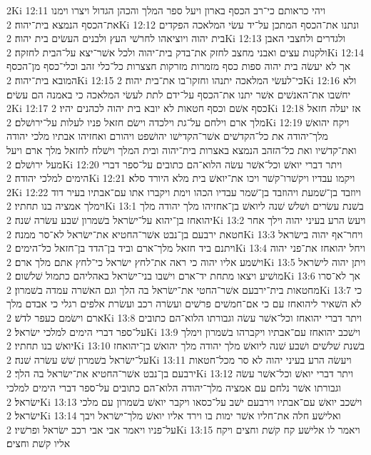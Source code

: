 2Ki 12:11  ויהי כראותם כי־רב הכסף בארון ויעל ספר המלך והכהן הגדול ויצרו וימנו את־הכסף הנמצא בית־יהוה׃
2Ki 12:12  ונתנו את־הכסף המתכן על־יד עשׂי המלאכה הפקדים בית יהוה ויוציאהו לחרשׁי העץ ולבנים העשׂים בית יהוה׃
2Ki 12:13  ולגדרים ולחצבי האבן ולקנות עצים ואבני מחצב לחזק את־בדק בית־יהוה ולכל אשׁר־יצא על־הבית לחזקה׃
2Ki 12:14  אך לא יעשׂה בית יהוה ספות כסף מזמרות מזרקות חצצרות כל־כלי זהב וכלי־כסף מן־הכסף המובא בית־יהוה׃
2Ki 12:15  כי־לעשׂי המלאכה יתנהו וחזקו־בו את־בית יהוה׃
2Ki 12:16  ולא יחשׁבו את־האנשׁים אשׁר יתנו את־הכסף על־ידם לתת לעשׂי המלאכה כי באמנה הם עשׂים׃
2Ki 12:17  כסף אשׁם וכסף חטאות לא יובא בית יהוה לכהנים יהיו׃
2Ki 12:18  אז יעלה חזאל מלך ארם וילחם על־גת וילכדה וישׂם חזאל פניו לעלות על־ירושׁלם׃
2Ki 12:19  ויקח יהואשׁ מלך־יהודה את כל־הקדשׁים אשׁר־הקדישׁו יהושׁפט ויהורם ואחזיהו אבתיו מלכי יהודה ואת־קדשׁיו ואת כל־הזהב הנמצא באצרות בית־יהוה ובית המלך וישׁלח לחזאל מלך ארם ויעל מעל ירושׁלם׃
2Ki 12:20  ויתר דברי יואשׁ וכל־אשׁר עשׂה הלוא־הם כתובים על־ספר דברי הימים למלכי יהודה׃
2Ki 12:21  ויקמו עבדיו ויקשׁרו־קשׁר ויכו את־יואשׁ בית מלא היורד סלא׃
2Ki 12:22  ויוזבד בן־שׁמעת ויהוזבד בן־שׁמר עבדיו הכהו וימת ויקברו אתו עם־אבתיו בעיר דוד וימלך אמציה בנו תחתיו׃
2Ki 13:1  בשׁנת עשׂרים ושׁלשׁ שׁנה ליואשׁ בן־אחזיהו מלך יהודה מלך יהואחז בן־יהוא על־ישׂראל בשׁמרון שׁבע עשׂרה שׁנה׃
2Ki 13:2  ויעשׂ הרע בעיני יהוה וילך אחר חטאת ירבעם בן־נבט אשׁר־החטיא את־ישׂראל לא־סר ממנה׃
2Ki 13:3  ויחר־אף יהוה בישׂראל ויתנם ביד חזאל מלך־ארם וביד בן־הדד בן־חזאל כל־הימים׃
2Ki 13:4  ויחל יהואחז את־פני יהוה וישׁמע אליו יהוה כי ראה את־לחץ ישׂראל כי־לחץ אתם מלך ארם׃
2Ki 13:5  ויתן יהוה לישׂראל מושׁיע ויצאו מתחת יד־ארם וישׁבו בני־ישׂראל באהליהם כתמול שׁלשׁום׃
2Ki 13:6  אך לא־סרו מחטאות בית־ירבעם אשׁר־החטי את־ישׂראל בה הלך וגם האשׁרה עמדה בשׁמרון׃
2Ki 13:7  כי לא השׁאיר ליהואחז עם כי אם־חמשׁים פרשׁים ועשׂרה רכב ועשׂרת אלפים רגלי כי אבדם מלך ארם וישׂמם כעפר לדשׁ׃
2Ki 13:8  ויתר דברי יהואחז וכל־אשׁר עשׂה וגבורתו הלוא־הם כתובים על־ספר דברי הימים למלכי ישׂראל׃
2Ki 13:9  וישׁכב יהואחז עם־אבתיו ויקברהו בשׁמרון וימלך יואשׁ בנו תחתיו׃
2Ki 13:10  בשׁנת שׁלשׁים ושׁבע שׁנה ליואשׁ מלך יהודה מלך יהואשׁ בן־יהואחז על־ישׂראל בשׁמרון שׁשׁ עשׂרה שׁנה׃
2Ki 13:11  ויעשׂה הרע בעיני יהוה לא סר מכל־חטאות ירבעם בן־נבט אשׁר־החטיא את־ישׂראל בה הלך׃
2Ki 13:12  ויתר דברי יואשׁ וכל־אשׁר עשׂה וגבורתו אשׁר נלחם עם אמציה מלך־יהודה הלוא־הם כתובים על־ספר דברי הימים למלכי ישׂראל׃
2Ki 13:13  וישׁכב יואשׁ עם־אבתיו וירבעם ישׁב על־כסאו ויקבר יואשׁ בשׁמרון עם מלכי ישׂראל׃
2Ki 13:14  ואלישׁע חלה את־חליו אשׁר ימות בו וירד אליו יואשׁ מלך־ישׂראל ויבך על־פניו ויאמר אבי אבי רכב ישׂראל ופרשׁיו׃
2Ki 13:15  ויאמר לו אלישׁע קח קשׁת וחצים ויקח אליו קשׁת וחצים׃
